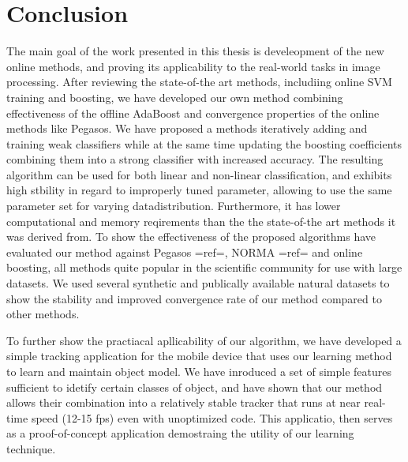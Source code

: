
\chapter{Conclusion} %

The main goal of the work presented in this thesis is develeopment of the new online methods, and proving its applicability to the real-world tasks in image processing. After reviewing the state-of-the art methods, includiing online SVM training and boosting, we have developed our own method combining  effectiveness of the offline AdaBoost and convergence properties of the online methods like Pegasos. We have proposed a methods iteratively adding and training weak classifiers while at the same time updating the boosting coefficients combining them into a strong classifier with increased accuracy. The resulting algorithm can be used for both linear and non-linear classification, and exhibits high stbility in regard to improperly tuned parameter, allowing to use the same parameter set for varying datadistribution. Furthermore, it has lower computational and memory reqirements than the the state-of-the art methods it was derived from. 
To show the effectiveness of the proposed algorithms have evaluated our method against Pegasos {{=ref=}}, NORMA  {{=ref=}} and online boosting, all methods quite popular in the scientific community for use with large datasets. We used several synthetic and publically available natural datasets to show the stability and improved convergence rate of our method compared to other methods.

To further show the practiacal apllicability of our algorithm, we have developed a simple tracking application for the mobile device that uses our learning method to learn and maintain object model. We have inroduced a set of simple features sufficient to idetify certain classes of object, and have shown that our method allows their combination into a relatively stable tracker that runs at near real-time speed (12-15 fps) even with unoptimized code. This applicatio, then serves as a proof-of-concept application demostraing the utility of our learning technique.



\ifpdf
    \graphicspath{{7/figures/PNG/}{7/figures/PDF/}{7/figures/}}
\else
    \graphicspath{{7/figures/EPS/}{7/figures/}}
\fi








